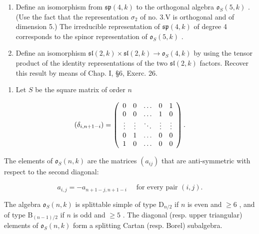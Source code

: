 \begin{enumerate}
\def\labelenumi{\alph{enumi})}
\setcounter{enumi}{1}
\item
  Define an isomorphism from \(\mathfrak{sp}(4,k)\) to the orthogonal algebra \(\mathfrak{o}_S(5,k)\) . (Use the fact that the representation \(\sigma_2\) of no. 3.V is orthogonal and of dimension 5.) The irreducible representation of \(\mathfrak{sp}(4,k)\) of degree 4 corresponds to the spinor representation of \(\mathfrak{o}_S(5,k)\) .
\item
  Define an isomorphism \(\mathfrak{sl}(2,k)\times\mathfrak{sl}(2,k)\to\mathfrak{o}_{S}(4,k)\) by using the tensor product of the identity representations of the two \(\mathfrak{sl}(2,k)\) factors. Recover this result by means of Chap. I, §6, Exerc. 26.
\end{enumerate}

\begin{enumerate}
\def\labelenumi{\arabic{enumi})}
\setcounter{enumi}{3}
\tightlist
\item
  Let \(S\) be the square matrix of order \(n\)
\end{enumerate}

\[
(\delta_ {i, n + 1 - i}) = \left( \begin{array}{c c c c c} 0 & 0 & \dots & 0 & 1 \\ 0 & 0 & \dots & 1 & 0 \\ \vdots & \vdots & \ddots & \vdots & \vdots \\ 0 & 1 & \dots & 0 & 0 \\ 1 & 0 & \dots & 0 & 0 \end{array} \right).
\]

The elements of \(\mathfrak{o}_{S}(n,k)\) are the matrices \((a_{ij})\) that are anti-symmetric with respect to the second diagonal:

\[
a _ {i, j} = - a _ {n + 1 - j, n + 1 - i} \quad \text {   for   every   pair   } (i, j).
\]

The algebra \(\mathfrak{o}_S(n,k)\) is splittable simple of type \(\mathrm{D}_{n/2}\) if \(n\) is even and \(\geq 6\) , and of type \(\mathrm{B}_{(n-1)/2}\) if \(n\) is odd and \(\geq 5\) . The diagonal (resp. upper triangular) elements of \(\mathfrak{o}_S(n,k)\) form a splitting Cartan (resp. Borel) subalgebra.

